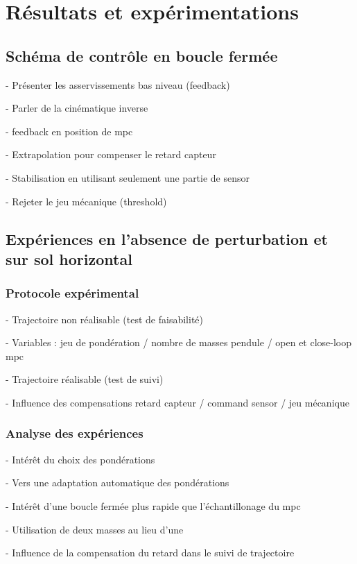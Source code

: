 \chapter{Résultats et expérimentations}

	\section{Schéma de contrôle en boucle fermée}
	\label{section.closedloop}

	- Présenter les asservissements bas niveau (feedback)
	
	- Parler de la cinématique inverse
	
	- feedback en position de mpc
	
	- Extrapolation pour compenser le retard capteur
	
	- Stabilisation en utilisant seulement une partie de sensor
	
	- Rejeter le jeu mécanique (threshold)
	
	\section{Expériences en l'absence de perturbation et sur sol horizontal}
		\subsection{Protocole expérimental}
		
			- Trajectoire non réalisable (test de faisabilité)
			
			- Variables : jeu de pondération / nombre de masses pendule / open et close-loop mpc
			
			- Trajectoire réalisable (test de suivi)
			
			- Influence des compensations retard capteur / command sensor / jeu mécanique 
		
		\subsection{Analyse des expériences}
		
			- Intérêt du choix des pondérations
			
			- Vers une adaptation automatique des pondérations
			
			- Intérêt d'une boucle fermée plus rapide que l'échantillonage du mpc
			
			- Utilisation de deux masses au lieu d'une
			
			- Influence de la compensation du retard dans le suivi de trajectoire
			

